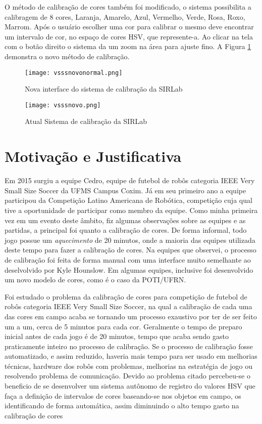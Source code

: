 O método de calibração de cores também foi modificado, o sistema possibilita a calibragem de 8 cores, Laranja, Amarelo, Azul, Vermelho, Verde, Rosa, Roxo, Marrom\cite{VSSVision}. Após o usuário escolher uma cor para calibrar o mesmo deve encontrar um intervalo de cor, no espaço de cores HSV, que represente-a. Ao clicar na tela com o botão direito o sistema da um zoom na área para ajuste fino. A Figura \ref{SIRLabNovaCalibracao} demonstra o novo método de calibração.
\begin{figure}[H]
\begin{minipage}[H]{0.45\linewidth}
\hspace{0.5cm}
\centering
\texttt{[image: vsssnovonormal.png]}
\caption{Nova interface do sistema de calibração da SIRLab\cite{VSSVision}}
\label{SIRLabNova}
\end{minipage}
\hspace{0.5cm}
\begin{minipage}[H]{0.40\linewidth}
\centering
\texttt{[image: vsssnovo.png]}
\caption{Atual Sistema de calibração da SIRLab\cite{VSSVision}}
\label{SIRLabNovaCalibracao}
\end{minipage}
\end{figure}	

\section{Motivação e Justificativa}
Em 2015 surgiu a equipe Cedro, equipe de futebol de robôs categoria IEEE Very Small Size Soccer da UFMS Campus Coxim. Já em seu primeiro ano a equipe participou da Competição Latino Americana de Robótica, competição cuja qual tive a oportunidade de participar como membro da equipe. Como minha primeira vez em um evento deste âmbito, fiz algumas observações sobre as equipes e as partidas, a principal foi quanto a calibração de cores. De forma informal, todo jogo possue um \emph{aquecimento} de 20 minutos, onde a maioria das equipes utilizada deste tempo para fazer a calibração de cores. Na equipes que observei, o processo de calibração foi feita de forma manual com uma interface muito semelhante ao deselvolvido por Kyle Hounslow\cite{YouTube}. Em algumas equipes, inclusive foi desenvolvido um novo modelo de cores, como é o caso da POTI/UFRN\cite{Martins:2007}.

Foi estudado o problema da calibração de cores para competição de futebol de robôs categoria IEEE Very Small Size Soccer, na qual a calibração de cada uma das cores em campo acaba se tornando um processo exaustivo por ter de ser feito um a um, cerca de 5 minutos para cada cor. Geralmente o tempo de preparo inicial antes de cada jogo é de 20 minutos, tempo que acaba sendo gasto praticamente inteiro no processo de calibração. Se o processo de calibração fosse automatizado, e assim reduzido, haveria mais tempo para ser usado em melhorias técnicas, hardware dos robôs com problemas, melhorias na estratégia de jogo ou resolvendo problema de comunicação. Devido ao problema citado percebeu-se o beneficio de se desenvolver um sistema autônomo de registro do valores HSV que faça a definição de intervalos de cores baseando-se nos objetos em campo, os identificando de forma automática, assim diminuindo o alto tempo gasto na calibração de cores 
